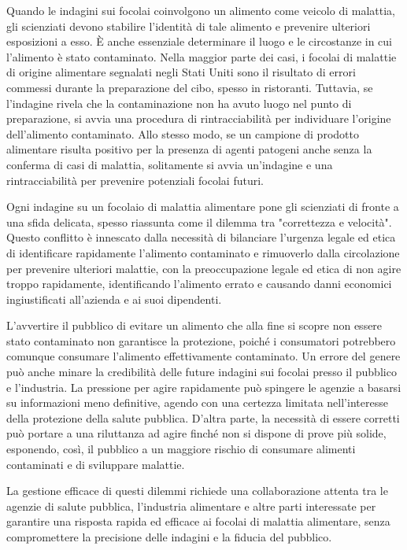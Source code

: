 Quando le indagini sui focolai coinvolgono un alimento come veicolo di malattia, gli scienziati devono stabilire l'identità di tale alimento e prevenire ulteriori esposizioni a esso. È anche essenziale determinare il luogo e le circostanze in cui l'alimento è stato contaminato. Nella maggior parte dei casi, i focolai di malattie di origine alimentare segnalati negli Stati Uniti sono il risultato di errori commessi durante la preparazione del cibo, spesso in ristoranti. Tuttavia, se l'indagine rivela che la contaminazione non ha avuto luogo nel punto di preparazione, si avvia una procedura di rintracciabilità per individuare l'origine dell'alimento contaminato. Allo stesso modo, se un campione di prodotto alimentare risulta positivo per la presenza di agenti patogeni anche senza la conferma di casi di malattia, solitamente si avvia un'indagine e una rintracciabilità per prevenire potenziali focolai futuri.

Ogni indagine su un focolaio di malattia alimentare pone gli scienziati di fronte a una sfida delicata, spesso riassunta come il dilemma tra "correttezza e velocità". Questo conflitto è innescato dalla necessità di bilanciare l'urgenza legale ed etica di identificare rapidamente l'alimento contaminato e rimuoverlo dalla circolazione per prevenire ulteriori malattie, con la preoccupazione legale ed etica di non agire troppo rapidamente, identificando l'alimento errato e causando danni economici ingiustificati all'azienda e ai suoi dipendenti.

L'avvertire il pubblico di evitare un alimento che alla fine si scopre non essere stato contaminato non garantisce la protezione, poiché i consumatori potrebbero comunque consumare l'alimento effettivamente contaminato. Un errore del genere può anche minare la credibilità delle future indagini sui focolai presso il pubblico e l'industria. La pressione per agire rapidamente può spingere le agenzie a basarsi su informazioni meno definitive, agendo con una certezza limitata nell'interesse della protezione della salute pubblica. D'altra parte, la necessità di essere corretti può portare a una riluttanza ad agire finché non si dispone di prove più solide, esponendo, così, il pubblico a un maggiore rischio di consumare alimenti contaminati e di sviluppare malattie.

La gestione efficace di questi dilemmi richiede una collaborazione attenta tra le agenzie di salute pubblica, l'industria alimentare e altre parti interessate per garantire una risposta rapida ed efficace ai focolai di malattia alimentare, senza compromettere la precisione delle indagini e la fiducia del pubblico.

